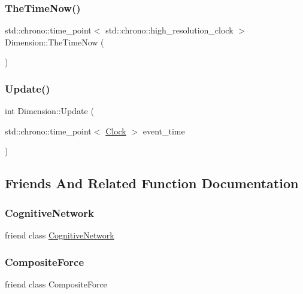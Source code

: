 \subsubsection{\texorpdfstring{The\+Time\+Now()}{TheTimeNow()}}
{\footnotesize\ttfamily std\+::chrono\+::time\+\_\+point$<$ std\+::chrono\+::high\+\_\+resolution\+\_\+clock $>$ Dimension\+::\+The\+Time\+Now (\begin{DoxyParamCaption}{ }\end{DoxyParamCaption})}

\mbox{\label{classDimension_a663916c2573b6df4db02ccee5678a75d}} 
\subsubsection{\texorpdfstring{Update()}{Update()}}
{\footnotesize\ttfamily int Dimension\+::\+Update (\begin{DoxyParamCaption}\item[{std\+::chrono\+::time\+\_\+point$<$ \mbox{\hyperlink{universe_8h_a0ef8d951d1ca5ab3cfaf7ab4c7a6fd80}{Clock}} $>$}]{event\+\_\+time }\end{DoxyParamCaption})}



\subsection{Friends And Related Function Documentation}
\mbox{\label{classDimension_ad04bbaef84caa0d408ec09a1c1302f5f}} 
\subsubsection{\texorpdfstring{Cognitive\+Network}{CognitiveNetwork}}
{\footnotesize\ttfamily friend class \mbox{\hyperlink{classCognitiveNetwork}{Cognitive\+Network}}\hspace{0.3cm}{\ttfamily [friend]}}

\mbox{\label{classDimension_a1dacbeca8e464bdc533a40a1b18f33b2}} 
\subsubsection{\texorpdfstring{Composite\+Force}{CompositeForce}}
{\footnotesize\ttfamily friend class Composite\+Force\hspace{0.3cm}{\ttfamily [friend]}}

